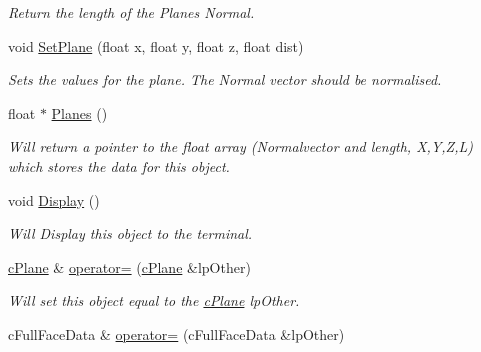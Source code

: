 \begin{DoxyCompactItemize}
\begin{DoxyCompactList}\small\item\em Return the length of the Planes Normal. \end{DoxyCompactList}\item 
\hypertarget{classc_plane_ae17fc24badba2a6d390be29d8184e5a8}{
void \hyperlink{classc_plane_ae17fc24badba2a6d390be29d8184e5a8}{SetPlane} (float x, float y, float z, float dist)}
\label{classc_plane_ae17fc24badba2a6d390be29d8184e5a8}

\begin{DoxyCompactList}\small\item\em Sets the values for the plane. The Normal vector should be normalised. \end{DoxyCompactList}\item 
\hypertarget{classc_plane_ace00104af4d7800e6055398e118433cd}{
float $\ast$ \hyperlink{classc_plane_ace00104af4d7800e6055398e118433cd}{Planes} ()}
\label{classc_plane_ace00104af4d7800e6055398e118433cd}

\begin{DoxyCompactList}\small\item\em Will return a pointer to the float array (Normalvector and length, X,Y,Z,L) which stores the data for this object. \end{DoxyCompactList}\item 
\hypertarget{classc_plane_a5a1e7a6390968cc282d8dc6b9ca2efaa}{
void \hyperlink{classc_plane_a5a1e7a6390968cc282d8dc6b9ca2efaa}{Display} ()}
\label{classc_plane_a5a1e7a6390968cc282d8dc6b9ca2efaa}

\begin{DoxyCompactList}\small\item\em Will Display this object to the terminal. \end{DoxyCompactList}\item 
\hypertarget{classc_plane_aea27ac3d572231c9a3f0e3a26d7ca55e}{
\hyperlink{classc_plane}{cPlane} \& \hyperlink{classc_plane_aea27ac3d572231c9a3f0e3a26d7ca55e}{operator=} (\hyperlink{classc_plane}{cPlane} \&lpOther)}
\label{classc_plane_aea27ac3d572231c9a3f0e3a26d7ca55e}

\begin{DoxyCompactList}\small\item\em Will set this object equal to the \hyperlink{classc_plane}{cPlane} lpOther. \end{DoxyCompactList}\item 
\hypertarget{classc_plane_a16b9cf3f2c8d0192fb77fd10a7458584}{
cFullFaceData \& \hyperlink{classc_plane_a16b9cf3f2c8d0192fb77fd10a7458584}{operator=} (cFullFaceData \&lpOther)}
\label{classc_plane_a16b9cf3f2c8d0192fb77fd10a7458584}


\end{DoxyCompactItemize}
